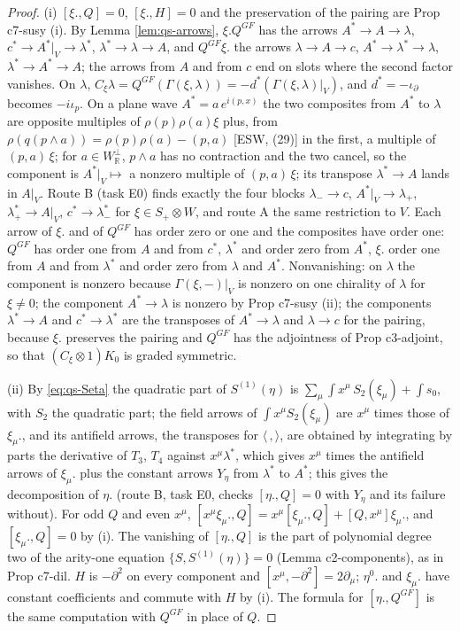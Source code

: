 \documentclass[11pt]{article}
\numberwithin{equation}{section}
\theoremstyle{plain}
\theoremstyle{definition}
\begin{document}
\begin{proof}
(i) $[\xi.,Q]=0$, $[\xi.,H]=0$ and the preservation of the pairing are Prop c7-susy (i). By Lemma \ref{lem:qs-arrows}, $\xi.Q^{GF}$ has the arrows $A^*\to A\to\lambda$, $c^*\to A^*|_V\to\lambda^*$, $\lambda^*\to\lambda\to A$, and $Q^{GF}\xi.$ the arrows $\lambda\to A\to c$, $A^*\to\lambda^*\to\lambda$, $\lambda^*\to A^*\to A$; the arrows from $A$ and from $c$ end on slots where the second factor vanishes. On $\lambda$, $C_\xi\lambda=Q^{GF}(\Gamma(\xi,\lambda))=-d^*(\Gamma(\xi,\lambda)|_V)$, and $d^*=-\iota_\partial$ becomes $-i\iota_p$. On a plane wave $A^*=a\,e^{i(p,x)}$ the two composites from $A^*$ to $\lambda$ are opposite multiples of $\rho(p)\rho(a)\xi$ plus, from $\rho(q(p\wedge a))=\rho(p)\rho(a)-(p,a)$ [ESW, (29)] in the first, a multiple of $(p,a)\,\xi$; for $a\in W^\perp_{\mathbb R}$, $p\wedge a$ has no contraction and the two cancel, so the component is $A^*|_V\mapsto$ a nonzero multiple of $(p,a)\,\xi$; its transpose $\lambda^*\to A$ lands in $A|_V$. Route B (task E0) finds exactly the four blocks $\lambda_-\to c$, $A^*|_V\to\lambda_+$, $\lambda^*_+\to A|_V$, $c^*\to\lambda^*_-$ for $\xi\in S_+\otimes W$, and route A the same restriction to $V$. Each arrow of $\xi.$ and of $Q^{GF}$ has order zero or one and the composites have order one: $Q^{GF}$ has order one from $A$ and from $c^*$, $\lambda^*$ and order zero from $A^*$, $\xi.$ order one from $A$ and from $\lambda^*$ and order zero from $\lambda$ and $A^*$. Nonvanishing: on $\lambda$ the component is nonzero because $\Gamma(\xi,-)|_V$ is nonzero on one chirality of $\lambda$ for $\xi\ne0$; the component $A^*\to\lambda$ is nonzero by Prop c7-susy (ii); the components $\lambda^*\to A$ and $c^*\to\lambda^*$ are the transposes of $A^*\to\lambda$ and $\lambda\to c$ for the pairing, because $\xi.$ preserves the pairing and $Q^{GF}$ has the adjointness of Prop c3-adjoint, so that $(C_\xi\otimes1)K_0$ is graded symmetric.

(ii) By \eqref{eq:qs-Seta} the quadratic part of $S^{(1)}(\eta)$ is $\sum_\mu\int x^\mu\,S_2(\xi_\mu)+\int s_0$, with $S_2$ the quadratic part; the field arrows of $\int x^\mu S_2(\xi_\mu)$ are $x^\mu$ times those of $\xi_\mu.$, and its antifield arrows, the transposes for $\langle\,,\rangle$, are obtained by integrating by parts the derivative of $T_3$, $T_4$ against $x^\mu\lambda^*$, which gives $x^\mu$ times the antifield arrows of $\xi_\mu.$ plus the constant arrows $Y_\eta$ from $\lambda^*$ to $A^*$; this gives the decomposition of $\eta.$ (route B, task E0, checks $[\eta.,Q]=0$ with $Y_\eta$ and its failure without). For odd $Q$ and even $x^\mu$, $[x^\mu\xi_\mu.,Q]=x^\mu[\xi_\mu.,Q]+[Q,x^\mu]\xi_\mu.$, and $[\xi_\mu.,Q]=0$ by (i). The vanishing of $[\eta.,Q]$ is the part of polynomial degree two of the arity-one equation $\{S,S^{(1)}(\eta)\}=0$ (Lemma c2-components), as in Prop c7-dil. $H$ is $-\partial^2$ on every component and $[x^\mu,-\partial^2]=2\partial_\mu$; $\eta^0.$ and $\xi_\mu.$ have constant coefficients and commute with $H$ by (i). The formula for $[\eta.,Q^{GF}]$ is the same computation with $Q^{GF}$ in place of $Q$.


\end{proof}
\end{document}
